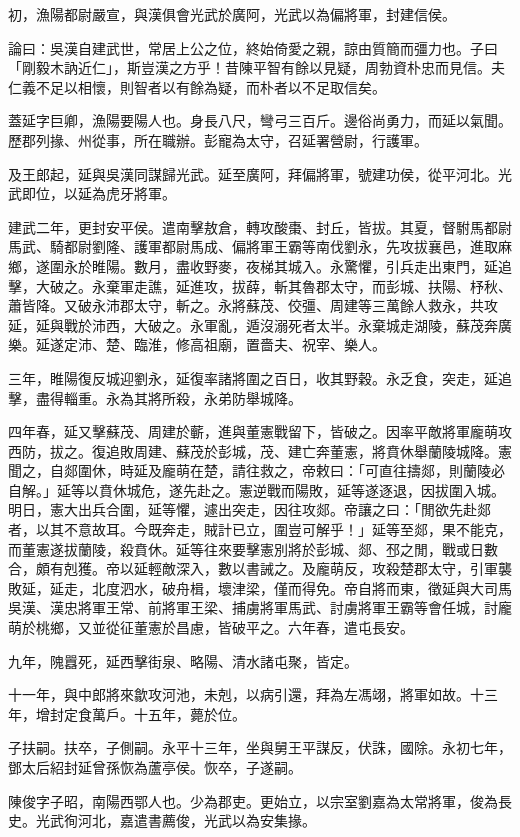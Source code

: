 \begin{pinyinscope}
初，漁陽都尉嚴宣，與漢俱會光武於廣阿，光武以為偏將軍，封建信侯。

論曰：吳漢自建武世，常居上公之位，終始倚愛之親，諒由質簡而彊力也。子曰「剛毅木訥近仁」，斯豈漢之方乎！昔陳平智有餘以見疑，周勃資朴忠而見信。夫仁義不足以相懷，則智者以有餘為疑，而朴者以不足取信矣。

蓋延字巨卿，漁陽要陽人也。身長八尺，彎弓三百斤。邊俗尚勇力，而延以氣聞。歷郡列掾、州從事，所在職辦。彭寵為太守，召延署營尉，行護軍。

及王郎起，延與吳漢同謀歸光武。延至廣阿，拜偏將軍，號建功侯，從平河北。光武即位，以延為虎牙將軍。

建武二年，更封安平侯。遣南擊敖倉，轉攻酸棗、封丘，皆拔。其夏，督駙馬都尉馬武、騎都尉劉隆、護軍都尉馬成、偏將軍王霸等南伐劉永，先攻拔襄邑，進取麻鄉，遂圍永於睢陽。數月，盡收野麥，夜梯其城入。永驚懼，引兵走出東門，延追擊，大破之。永棄軍走譙，延進攻，拔薛，斬其魯郡太守，而彭城、扶陽、杼秋、蕭皆降。又破永沛郡太守，斬之。永將蘇茂、佼彊、周建等三萬餘人救永，共攻延，延與戰於沛西，大破之。永軍亂，遁沒溺死者太半。永棄城走湖陵，蘇茂奔廣樂。延遂定沛、楚、臨淮，修高祖廟，置嗇夫、祝宰、樂人。

三年，睢陽復反城迎劉永，延復率諸將圍之百日，收其野穀。永乏食，突走，延追擊，盡得輜重。永為其將所殺，永弟防舉城降。

四年春，延又擊蘇茂、周建於蘄，進與董憲戰留下，皆破之。因率平敵將軍龐萌攻西防，拔之。復追敗周建、蘇茂於彭城，茂、建亡奔董憲，將賁休舉蘭陵城降。憲聞之，自郯圍休，時延及龐萌在楚，請往救之，帝敕曰：「可直往擣郯，則蘭陵必自解。」延等以賁休城危，遂先赴之。憲逆戰而陽敗，延等遂逐退，因拔圍入城。明日，憲大出兵合圍，延等懼，遽出突走，因往攻郯。帝讓之曰：「閒欲先赴郯者，以其不意故耳。今既奔走，賊計已立，圍豈可解乎！」延等至郯，果不能克，而董憲遂拔蘭陵，殺賁休。延等往來要擊憲別將於彭城、郯、邳之閒，戰或日數合，頗有剋獲。帝以延輕敵深入，數以書誡之。及龐萌反，攻殺楚郡太守，引軍襲敗延，延走，北度泗水，破舟楫，壞津梁，僅而得免。帝自將而東，徵延與大司馬吳漢、漢忠將軍王常、前將軍王梁、捕虜將軍馬武、討虜將軍王霸等會任城，討龐萌於桃鄉，又並從征董憲於昌慮，皆破平之。六年春，遣屯長安。

九年，隗囂死，延西擊街泉、略陽、清水諸屯聚，皆定。

十一年，與中郎將來歙攻河池，未剋，以病引還，拜為左馮翊，將軍如故。十三年，增封定食萬戶。十五年，薨於位。

子扶嗣。扶卒，子側嗣。永平十三年，坐與舅王平謀反，伏誅，國除。永初七年，鄧太后紹封延曾孫恢為蘆亭侯。恢卒，子遂嗣。

陳俊字子昭，南陽西鄂人也。少為郡吏。更始立，以宗室劉嘉為太常將軍，俊為長史。光武徇河北，嘉遣書薦俊，光武以為安集掾。


\end{pinyinscope}
